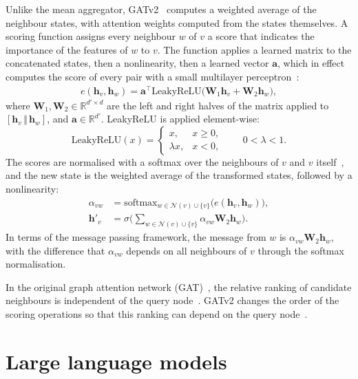Unlike the mean aggregator, GATv2~\cite{brody2022attentive} computes a weighted average of the neighbour states, with attention weights computed from the states themselves. A scoring function assigns every neighbour $w$ of $v$ a score that indicates the importance of the features of $w$ to $v$. The function applies a learned matrix to the concatenated states, then a nonlinearity, then a learned vector $\mathbf{a}$, which in effect computes the score of every pair with a small multilayer perceptron~\cite{brody2022attentive}:
\begin{align}
  e(\mathbf{h}_v, \mathbf{h}_w) = \mathbf{a}^\top \mathrm{LeakyReLU}\big(\mathbf{W}_1 \mathbf{h}_v + \mathbf{W}_2 \mathbf{h}_w\big),
  \label{eq:gatv2-score}
\end{align}
where $\mathbf{W}_1, \mathbf{W}_2 \in \mathbb{R}^{d' \times d}$ are the left and right halves of the matrix applied to $[\mathbf{h}_v \,\Vert\, \mathbf{h}_w]$, and $\mathbf{a} \in \mathbb{R}^{d'}$. LeakyReLU is applied element-wise:
\[
  \mathrm{LeakyReLU}(x) =
  \begin{cases}
    x, & x \geq 0, \\
    \lambda x, & x < 0,
  \end{cases}
  \qquad 0 < \lambda < 1.
\]
The scores are normalised with a softmax over the neighbours of $v$ and $v$ itself~\cite{velickovic2018graph}, and the new state is the weighted average of the transformed states, followed by a nonlinearity:
\begin{align}
  \alpha_{vw} &= \mathrm{softmax}_{w \in \mathcal{N}(v) \cup \{v\}}\big(e(\mathbf{h}_v, \mathbf{h}_w)\big), \label{eq:gatv2-softmax} \\
  \mathbf{h}'_v &= \sigma\Big(\sum_{w \in \mathcal{N}(v) \cup \{v\}} \alpha_{vw} \mathbf{W}_2 \mathbf{h}_w\Big). \label{eq:gatv2-output}
\end{align}
In terms of the message passing framework, the message from $w$ is $\alpha_{vw}\mathbf{W}_2\mathbf{h}_w$, with the difference that $\alpha_{vw}$ depends on all neighbours of $v$ through the softmax normalisation.

In the original graph attention network (GAT)~\cite{velickovic2018graph}, the relative ranking of candidate neighbours is independent of the query node~\cite{brody2022attentive}. GATv2 changes the order of the scoring operations so that this ranking can depend on the query node~\cite{brody2022attentive}.

\section{Large language models}
\label{sec:llm}

